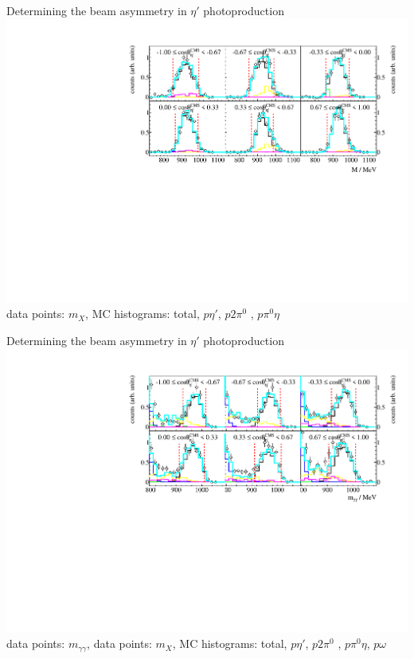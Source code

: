 \documentclass[11pt,aspectratio=169,dvipsnames]{beamer}
\begin{document}
\begin{frame}{Determining the beam asymmetry in $\eta'$ photoproduction}
	\vspace{-0.5cm}
	\includegraphics[width=.95\linewidth]{../../figs/hydrogen/bin_cuts/mismcut_ebin1.pdf}
	data points: $m_X$, MC histograms: {\color{Turquoise}total}, $p\eta'$, {\color{yellow} $p2\pi^0$ }, {\color{magenta} $p\pi^0\eta$}
\end{frame}
\begin{frame}{Determining the beam asymmetry in $\eta'$ photoproduction}
	\vspace{-0.5cm}
	\includegraphics[width=.95\linewidth]{../../figs/hydrogen/bin_cuts/invcut_ebin1.pdf}
	data points: $m_{\gamma\gamma}$, data points: $m_X$, MC histograms: {\color{Turquoise}total}, $p\eta'$, {\color{yellow} $p2\pi^0$ }, {\color{magenta} $p\pi^0\eta$}, {\color{blue}$p\omega$}
\end{frame}
\end{document}
